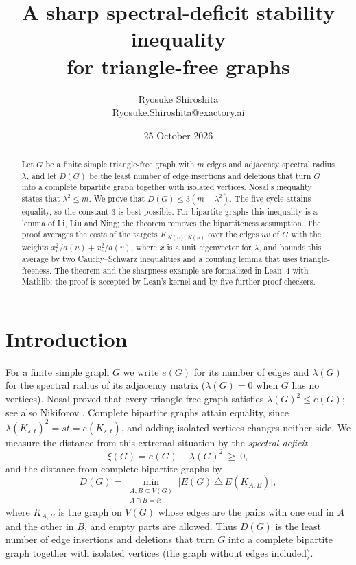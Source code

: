 \documentclass[11pt]{article}
\title{A sharp spectral-deficit stability inequality\\ for triangle-free graphs}
\author{Ryosuke Shiroshita\\[3pt]
\small\href{mailto:Ryosuke.Shiroshita@exactory.ai}{Ryosuke.Shiroshita@exactory.ai}}
\date{25 October 2026}
\theoremstyle{remark}
\begin{document}
\maketitle

\begin{abstract}
Let $G$ be a finite simple triangle-free graph with $m$ edges and adjacency spectral radius
$\lambda$, and let $D(G)$ be the least number of edge insertions and deletions that turn $G$ into a
complete bipartite graph together with isolated vertices. Nosal's inequality states that
$\lambda^2\le m$. We prove that $D(G)\le 3(m-\lambda^2)$. The five-cycle attains equality, so the
constant $3$ is best possible. For bipartite graphs this inequality is a lemma of Li, Liu and
Ning; the theorem removes the bipartiteness assumption. The proof averages the costs of the
targets $K_{N(v),N(u)}$ over the edges $uv$ of $G$ with the weights $x_u^2/d(u)+x_v^2/d(v)$, where
$x$ is a unit eigenvector for $\lambda$, and bounds this average by two Cauchy--Schwarz
inequalities and a counting lemma that uses triangle-freeness. The theorem and the sharpness
example are formalized in Lean~4 with Mathlib; the proof is accepted by Lean's kernel and by five
further proof checkers.
\end{abstract}

\section{Introduction}

For a finite simple graph $G$ we write $e(G)$ for its number of edges and $\lambda(G)$ for the
spectral radius of its adjacency matrix ($\lambda(G)=0$ when $G$ has no vertices). Nosal
\cite{Nosal} proved that every triangle-free graph satisfies $\lambda(G)^2\le e(G)$; see also
Nikiforov \cite{Nikiforov}. Complete bipartite graphs attain equality,
since $\lambda(K_{s,t})^2=st=e(K_{s,t})$, and adding isolated vertices changes neither side. We
measure the distance from this extremal situation by the \emph{spectral deficit}
\[
  \xi(G)=e(G)-\lambda(G)^2\ \ge\ 0 ,
\]
and the distance from complete bipartite graphs by
\[
  D(G)=\min_{\substack{A,B\subseteq V(G)\\ A\cap B=\varnothing}}\bigl|E(G)\,\triangle\,E(K_{A,B})\bigr| ,
\]
where $K_{A,B}$ is the graph on $V(G)$ whose edges are the pairs with one end in $A$ and the
other in $B$, and empty parts are allowed. Thus $D(G)$ is the least number of edge insertions and
deletions that turn $G$ into a complete bipartite graph together with isolated vertices (the
graph without edges included).
\end{document}
